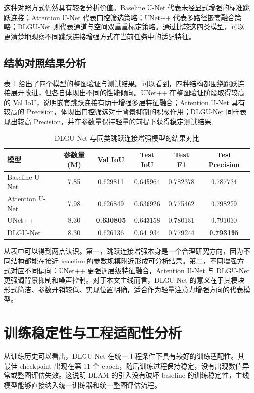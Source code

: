 这种对照方式仍然具有较强分析价值。Baseline U-Net 代表未经显式增强的标准跳跃连接；Attention U-Net 代表门控筛选策略；UNet++ 代表多路径嵌套融合策略；DLGU-Net 则代表通道与空间双重重标定策略。通过比较这四类模型，可以更清楚地观察不同跳跃连接增强方式在当前任务中的适配特征。

\subsection{结构对照结果分析}
表 \ref{tab:v2-dlgu-compare} 给出了四个模型的整图验证与测试结果。可以看到，四种结构都围绕跳跃连接展开改进，但各自体现出不同的性能倾向。UNet++ 在整图验证阶段取得较高的 Val IoU，说明嵌套跳跃连接有助于增强多层特征融合；Attention U-Net 具有较高的 Precision，体现出门控筛选对于背景抑制的积极作用；DLGU-Net 同样表现出较高 Precision，并在参数量保持轻量的前提下获得稳定测试结果。

\begin{table}[htbp]
\centering
\caption{DLGU-Net 与同类跳跃连接增强模型的结果对比}
\label{tab:v2-dlgu-compare}
\begin{tabular}{lccccc}
\toprule
模型 & 参数量(M) & Val IoU & Test IoU & Test F1 & Test Precision \\
\midrule
Baseline U-Net & 7.85 & 0.629811 & 0.645964 & 0.782378 & 0.787734 \\
Attention U-Net & 7.98 & 0.626849 & 0.636926 & 0.775462 & 0.798229 \\
UNet++ & 8.30 & \textbf{0.630805} & 0.643158 & 0.780181 & 0.791030 \\
DLGU-Net & 8.30 & 0.626136 & 0.641934 & 0.779244 & \textbf{0.793195} \\
\bottomrule
\end{tabular}
\end{table}

从表中可以得到两点认识。第一，跳跃连接增强本身是一个合理研究方向，因为不同结构都能在接近 baseline 的参数规模附近形成可分析结果。第二，不同增强方式对应不同偏向：UNet++ 更强调层级特征融合，Attention U-Net 与 DLGU-Net 更强调背景抑制和噪声控制。对于本文主线而言，DLGU-Net 的意义在于其模块形式简洁、参数开销较低、实现位置明确，适合作为轻量注意力增强方向的代表模型。

\section{训练稳定性与工程适配性分析}
从训练历史可以看出，DLGU-Net 在统一工程条件下具有较好的训练适配性。其最佳 checkpoint 出现在第 11 个 epoch，随后训练过程保持稳定，没有出现数值异常或整图评估失效。这说明 DLAM 的引入没有破坏 baseline 的训练稳定性，主线模型能够直接纳入统一训练器和统一整图评估流程。

